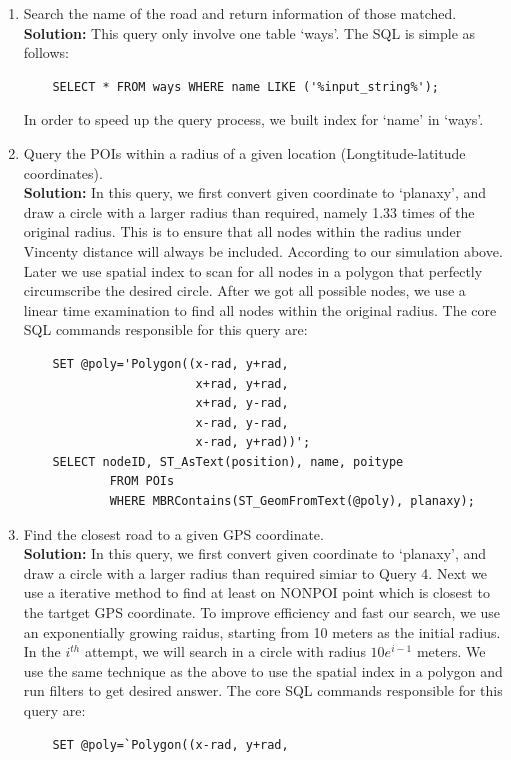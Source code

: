 \documentclass[final,1p,times]{elsarticle}
\begin{document}
\begin{enumerate}
  \item Search the name of the road and return information of those matched.\\
  \textbf{Solution:} This query only involve one table `ways'. The SQL is simple as follows:
  \begin{verbatim}
    SELECT * FROM ways WHERE name LIKE ('%input_string%');
  \end{verbatim}
  In order to speed up the query process, we built index for `name' in `ways'.
  \item Query the POIs within a radius of a given location (Longtitude-latitude coordinates).\\
  \textbf{Solution:} In this query, we first convert given coordinate to `planaxy', and draw a circle with a larger radius than required, namely 1.33 times of the original radius. This is to ensure that all nodes within the radius under Vincenty distance will always be included. According to our simulation above. Later we use spatial index to scan for all nodes in a polygon that perfectly circumscribe the desired circle. After we got all possible nodes, we use a linear time examination to find all nodes within the original radius. The core SQL commands responsible for this query are:
  \begin{verbatim}
    SET @poly='Polygon((x-rad, y+rad, 
                        x+rad, y+rad, 
                        x+rad, y-rad, 
                        x-rad, y-rad, 
                        x-rad, y+rad))';
    SELECT nodeID, ST_AsText(position), name, poitype
            FROM POIs
            WHERE MBRContains(ST_GeomFromText(@poly), planaxy);
  \end{verbatim}
  \item Find the closest road to a given GPS coordinate.\\
  \textbf{Solution:} In this query, we first convert given coordinate to `planaxy', and draw a circle with a larger radius than required simiar to Query 4. Next we use a iterative method to find at least on NONPOI point which is closest to the tartget GPS coordinate. To improve efficiency and fast our search, we use an exponentially growing raidus, starting from 10 meters as the initial radius. In the $i^{th}$ attempt, we will search in a circle with radius $10e^{i-1}$ meters. We use the same technique as the above to use the spatial index in a polygon and run filters to get desired answer. The core SQL commands responsible for this query are:
  \begin{verbatim}
    SET @poly=`Polygon((x-rad, y+rad, 

\end{verbatim}
\end{enumerate}
\end{document}
